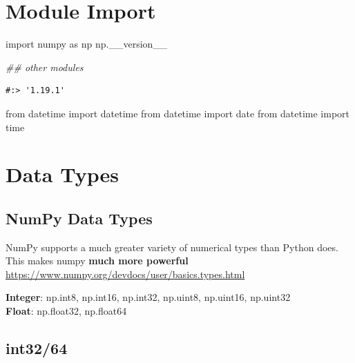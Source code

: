 \documentclass[
]{book}
\newenvironment{Shaded}{\begin{snugshade}}{\end{snugshade}}
\newcommand{\CommentTok}[1]{\textcolor[rgb]{0.37,0.37,0.37}{\textit{#1}}}
\newcommand{\ImportTok}[1]{#1}
\newcommand{\NormalTok}[1]{#1}
\begin{document}
\hypertarget{module-import-1}{%
\section{Module Import}\label{module-import-1}}

\begin{Shaded}
\begin{Highlighting}[]
\ImportTok{import}\NormalTok{ numpy }\ImportTok{as}\NormalTok{ np}
\NormalTok{np.__version__}

\CommentTok{## other modules}
\end{Highlighting}
\end{Shaded}

\begin{verbatim}
#:> '1.19.1'
\end{verbatim}

\begin{Shaded}
\begin{Highlighting}[]
\ImportTok{from}\NormalTok{ datetime }\ImportTok{import}\NormalTok{ datetime}
\ImportTok{from}\NormalTok{ datetime }\ImportTok{import}\NormalTok{ date}
\ImportTok{from}\NormalTok{ datetime }\ImportTok{import}\NormalTok{ time}
\end{Highlighting}
\end{Shaded}

\hypertarget{data-types}{%
\section{Data Types}\label{data-types}}

\hypertarget{numpy-data-types}{%
\subsection{NumPy Data Types}\label{numpy-data-types}}

NumPy supports a much greater variety of numerical types than Python does. This makes numpy \textbf{much more powerful} \url{https://www.numpy.org/devdocs/user/basics.types.html}

\textbf{Integer}: np.int8, np.int16, np.int32, np.uint8, np.uint16, np.uint32\\
\textbf{Float}: np.float32, np.float64

\hypertarget{int3264}{%
\subsection{int32/64}\label{int3264}}
\end{document}

